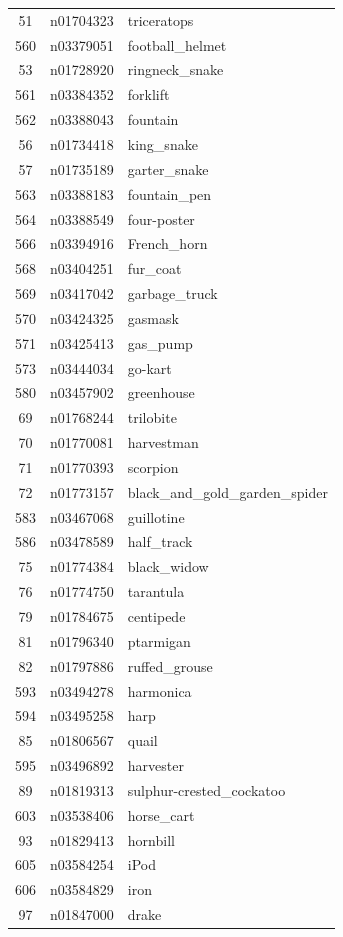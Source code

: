 \begin{table}
\begin{tabular}{cll}
51 & n01704323 & triceratops \\
560 & n03379051 & football_helmet \\
53 & n01728920 & ringneck_snake \\
561 & n03384352 & forklift \\
562 & n03388043 & fountain \\
56 & n01734418 & king_snake \\
57 & n01735189 & garter_snake \\
563 & n03388183 & fountain_pen \\
564 & n03388549 & four-poster \\
566 & n03394916 & French_horn \\
568 & n03404251 & fur_coat \\
569 & n03417042 & garbage_truck \\
570 & n03424325 & gasmask \\
571 & n03425413 & gas_pump \\
573 & n03444034 & go-kart \\
580 & n03457902 & greenhouse \\
69 & n01768244 & trilobite \\
70 & n01770081 & harvestman \\
71 & n01770393 & scorpion \\
72 & n01773157 & black_and_gold_garden_spider \\
583 & n03467068 & guillotine \\
586 & n03478589 & half_track \\
75 & n01774384 & black_widow \\
76 & n01774750 & tarantula \\
79 & n01784675 & centipede \\
81 & n01796340 & ptarmigan \\
82 & n01797886 & ruffed_grouse \\
593 & n03494278 & harmonica \\
594 & n03495258 & harp \\
85 & n01806567 & quail \\
595 & n03496892 & harvester \\
89 & n01819313 & sulphur-crested_cockatoo \\
603 & n03538406 & horse_cart \\
93 & n01829413 & hornbill \\
605 & n03584254 & iPod \\
606 & n03584829 & iron \\
97 & n01847000 & drake \\

\end{tabular}
\end{table}
